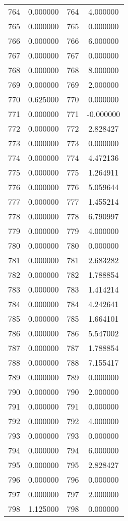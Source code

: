 \documentclass[12pt]{article}
\begin{document}
\begin{longtable}{@{}cccc@{}}
764 & 0.000000 & 764 & 4.000000 \\
765 & 0.000000 & 765 & 0.000000 \\
766 & 0.000000 & 766 & 6.000000 \\
767 & 0.000000 & 767 & 0.000000 \\
768 & 0.000000 & 768 & 8.000000 \\
769 & 0.000000 & 769 & 2.000000 \\
770 & 0.625000 & 770 & 0.000000 \\
771 & 0.000000 & 771 & -0.000000 \\
772 & 0.000000 & 772 & 2.828427 \\
773 & 0.000000 & 773 & 0.000000 \\
774 & 0.000000 & 774 & 4.472136 \\
775 & 0.000000 & 775 & 1.264911 \\
776 & 0.000000 & 776 & 5.059644 \\
777 & 0.000000 & 777 & 1.455214 \\
778 & 0.000000 & 778 & 6.790997 \\
779 & 0.000000 & 779 & 4.000000 \\
780 & 0.000000 & 780 & 0.000000 \\
781 & 0.000000 & 781 & 2.683282 \\
782 & 0.000000 & 782 & 1.788854 \\
783 & 0.000000 & 783 & 1.414214 \\
784 & 0.000000 & 784 & 4.242641 \\
785 & 0.000000 & 785 & 1.664101 \\
786 & 0.000000 & 786 & 5.547002 \\
787 & 0.000000 & 787 & 1.788854 \\
788 & 0.000000 & 788 & 7.155417 \\
789 & 0.000000 & 789 & 0.000000 \\
790 & 0.000000 & 790 & 2.000000 \\
791 & 0.000000 & 791 & 0.000000 \\
792 & 0.000000 & 792 & 4.000000 \\
793 & 0.000000 & 793 & 0.000000 \\
794 & 0.000000 & 794 & 6.000000 \\
795 & 0.000000 & 795 & 2.828427 \\
796 & 0.000000 & 796 & 0.000000 \\
797 & 0.000000 & 797 & 2.000000 \\
798 & 1.125000 & 798 & 0.000000 \\

\end{longtable}
\end{document}
